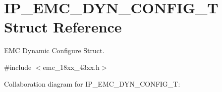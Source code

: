 \hypertarget{struct_i_p___e_m_c___d_y_n___c_o_n_f_i_g___t}{}\section{I\+P\+\_\+\+E\+M\+C\+\_\+\+D\+Y\+N\+\_\+\+C\+O\+N\+F\+I\+G\+\_\+T Struct Reference}
\label{struct_i_p___e_m_c___d_y_n___c_o_n_f_i_g___t}


E\+MC Dynamic Configure Struct.  




{\ttfamily \#include $<$emc\+\_\+18xx\+\_\+43xx.\+h$>$}



Collaboration diagram for I\+P\+\_\+\+E\+M\+C\+\_\+\+D\+Y\+N\+\_\+\+C\+O\+N\+F\+I\+G\+\_\+T\+:
